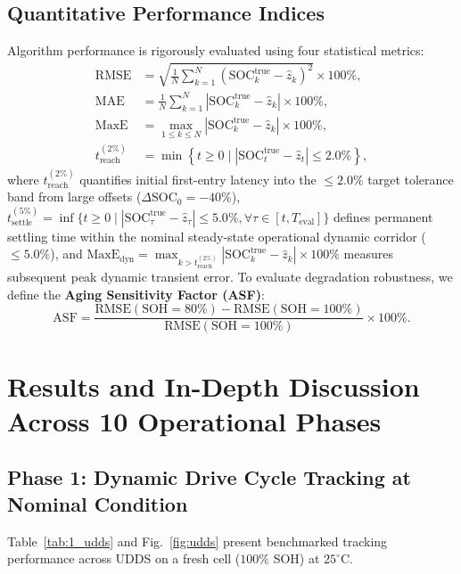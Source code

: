 \documentclass[preprint,12pt]{elsarticle}
\begin{document}
\subsection{Quantitative Performance Indices}
Algorithm performance is rigorously evaluated using four statistical metrics:
\begin{align}
\text{RMSE} &= \sqrt{\tfrac{1}{N}\textstyle\sum_{k=1}^N (\text{SOC}_k^{\text{true}} - \hat{z}_k)^2} \times 100\%, \label{eqn:rmse}\\
\text{MAE} &= \tfrac{1}{N}\textstyle\sum_{k=1}^N |\text{SOC}_k^{\text{true}} - \hat{z}_k| \times 100\%, \label{eqn:mae}\\
\text{MaxE} &= \max_{1 \le k \le N} |\text{SOC}_k^{\text{true}} - \hat{z}_k| \times 100\%, \label{eqn:maxe}\\
t_{\text{reach}}^{(2\%)} &= \min\left\{ t \ge 0 \mid |\text{SOC}_t^{\text{true}} - \hat{z}_t| \le 2.0\% \right\}, \label{eqn:treach}
\end{align}
where $t_{\text{reach}}^{(2\%)}$ quantifies initial first-entry latency into the $\le 2.0\%$ target tolerance band from large offsets ($\Delta\text{SOC}_0 = -40\%$), $t_{\text{settle}}^{(5\%)} = \inf\{ t \ge 0 \mid |\text{SOC}_\tau^{\text{true}} - \hat{z}_\tau| \le 5.0\%, \forall \tau \in [t, T_{\text{eval}}] \}$ defines permanent settling time within the nominal steady-state operational dynamic corridor ($\le 5.0\%$), and $\text{MaxE}_{\text{dyn}} = \max_{k > t_{\text{reach}}^{(2\%)}} |\text{SOC}_k^{\text{true}} - \hat{z}_k| \times 100\%$ measures subsequent peak dynamic transient error.
To evaluate degradation robustness, we define the \textbf{Aging Sensitivity Factor (ASF)}:
\begin{equation}\label{eqn:asf}
\text{ASF} = \frac{\text{RMSE}(\text{SOH}=80\%) - \text{RMSE}(\text{SOH}=100\%)}{\text{RMSE}(\text{SOH}=100\%)} \times 100\%.
\end{equation}

\section{Results and In-Depth Discussion Across 10 Operational Phases}

\subsection{Phase 1: Dynamic Drive Cycle Tracking at Nominal Condition}
Table~\ref{tab:1_udds} and Fig.~\ref{fig:udds} present benchmarked tracking performance across UDDS on a fresh cell ($100\%$ SOH) at $25^\circ\text{C}$.
\end{document}
